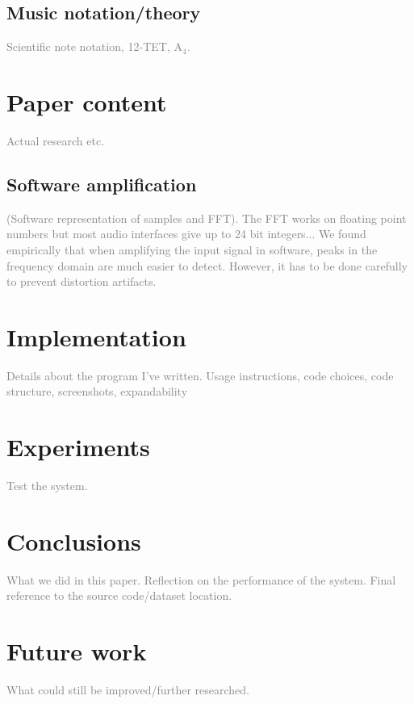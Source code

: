 \documentclass[10pt,twocolumn]{article}
\newcommand{\note}[2]{#1${}_#2$}
\begin{document}
\subsection{Music notation/theory}
\textcolor{gray}{Scientific note notation, 12-TET, \note{A}{4}.}


\section{Paper content}
\textcolor{gray}{Actual research etc.}

\subsection{Software amplification}
\textcolor{gray}{(Software representation of samples and FFT). The FFT works on floating point numbers but most audio interfaces give up to 24 bit integers...}
\textcolor{gray}{We found empirically that when amplifying the input signal in software, peaks in the frequency domain are much easier to detect. However, it has to be done carefully to prevent distortion artifacts.}


\section{Implementation}
\textcolor{gray}{Details about the program I've written. Usage instructions, code choices, code structure, screenshots, expandability}


\section{Experiments}  \label{sec:exp}
\textcolor{gray}{Test the system.}


\section{Conclusions}
\textcolor{gray}{What we did in this paper. Reflection on the performance of the system. Final reference to the source code/dataset location.}


\section{Future work}  \label{sec:future}
\textcolor{gray}{What could still be improved/further researched.}





\end{document}
